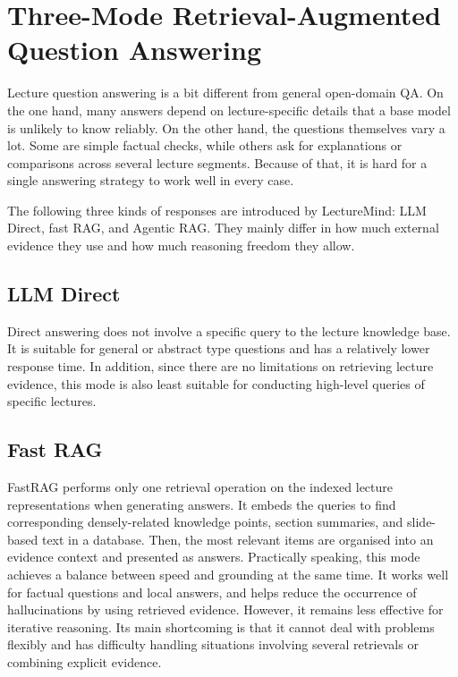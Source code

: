 \section{Three-Mode Retrieval-Augmented Question Answering}

Lecture question answering is a bit different from general open-domain QA. On the one hand, many answers depend on lecture-specific details that a base model is unlikely to know reliably. On the other hand, the questions themselves vary a lot. Some are simple factual checks, while others ask for explanations or comparisons across several lecture segments. Because of that, it is hard for a single answering strategy to work well in every case.

The following three kinds of responses are introduced by LectureMind: LLM Direct, fast RAG, and Agentic RAG. They mainly differ in how much external evidence they use and how much reasoning freedom they allow.

\subsection{LLM Direct}

Direct answering does not involve a specific query to the lecture knowledge base. It is suitable for general or abstract type questions and has a relatively lower response time. In addition, since there are no limitations on retrieving lecture evidence, this mode is also least suitable for conducting high-level queries of specific lectures.

\subsection{Fast RAG}

FastRAG performs only one retrieval operation on the indexed lecture representations when generating answers. It embeds the queries to find corresponding densely-related knowledge points, section summaries, and slide-based text in a database. Then, the most relevant items are organised into an evidence context and presented as answers. Practically speaking, this mode achieves a balance between speed and grounding at the same time. It works well for factual questions and local answers, and helps reduce the occurrence of hallucinations by using retrieved evidence. However, it remains less effective for iterative reasoning. Its main shortcoming is that it cannot deal with problems flexibly and has difficulty handling situations involving several retrievals or combining explicit evidence.

